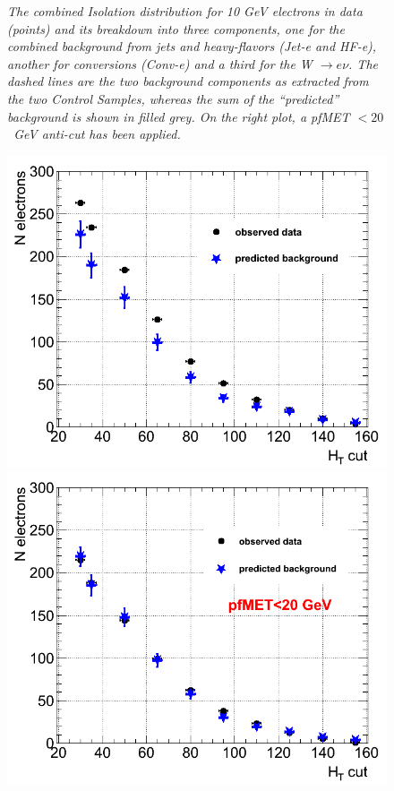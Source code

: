 \begin{figure}[h!]
\caption{\textit{The combined Isolation distribution for 10 GeV electrons in data (points) and its breakdown into three components, one for the combined background from jets and heavy-flavors (Jet-e and HF-e), another for conversions (Conv-e) and a third for the W $\rightarrow e\nu$. The dashed lines are the two background components as extracted from the two Control Samples, whereas the sum of the ``predicted'' background is shown in filled grey. On the right plot, a pfMET $ < 20$~GeV anti-cut has been applied.  }}
\label{fig:d_combIso_fit}
\end{figure}

\begin{figure}[h!]
\centering
\includegraphics[scale=0.32]{Plots/d_fitprediction_pt10_vsHT.png}
\includegraphics[scale=0.32]{Plots/d_fitprediction_pt10_METanticut_vsHT.png}

\end{figure}

